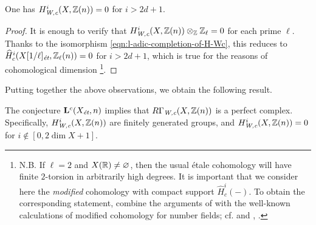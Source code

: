 \documentclass{article}
\numberwithin{equation}{section}
\begin{document}
\begin{corollary}
  One has $H^i_\Wc (X, \ZZ(n)) = 0$ for $i > 2d+1$.

  \begin{proof}
    It is enough to verify that $H^i_\Wc (X, \ZZ(n)) \otimes_\ZZ \ZZ_\ell = 0$
    for each prime $\ell$. Thanks to the isomorphism
    \eqref{eqn:l-adic-completion-of-H-Wc}, this reduces to
    $\widehat{H}_c^i (X [1/\ell]_\et, \ZZ_\ell (n)) = 0$ for $i > 2d+1$,
    which is true for the reasons of cohomological dimension
    \cite[Exposé~X, Théorème~6.2]{SGA4}\footnote{N.B. If $\ell = 2$ and
      $X (\RR) \ne \emptyset$, then the usual étale cohomology will have finite
      $2$-torsion in arbitrarily high degrees. It is important that we consider
      here the \emph{modified} cohomology with compact support
      $\widehat{H}_c^i (-)$. To obtain the corresponding statement, combine the
      arguments of \cite[Exposé~X]{SGA4} with the well-known calculations of
      modified cohomology for number fields; cf. \cite[Chapter~II]{Milne-ADT}
      and \cite{Artin-Verdier-1964}, \cite{Mazur-1973}.}.
  \end{proof}
\end{corollary}

Putting together the above observations, we obtain the following result.

\begin{proposition}
  \label{prop:RGammaWc-perfect}
  The conjecture $\mathbf{L}^c (X_\et,n)$ implies that $R\Gamma_\Wc (X, \ZZ(n))$
  is a perfect complex. Specifically, $H^i_\Wc (X, \ZZ(n))$ are finitely
  generated groups, and $H^i_\Wc (X, \ZZ(n)) = 0$ for
  $i \notin [0, 2\dim X + 1]$.
\end{proposition}
\end{document}
